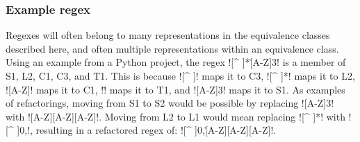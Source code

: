 \subsubsection{Example regex}
Regexes will often belong to many representations in the equivalence classes described here, and often multiple representations within an equivalence class.
Using an example from a Python project, the regex \cverb![^ ]*\.[A-Z]{3}! is a member of S1, L2, C1, C3, and T1. This is because \cverb![^ ]! maps it to C3, \cverb![^ ]*! maps it to L2, \cverb![A-Z]! maps it to C1, \cverb!\.! maps it to T1, and \cverb![A-Z]{3}! maps it to S1.
As examples of refactorings, moving from S1 to S2 would be possible by replacing \cverb![A-Z]{3}! with \cverb![A-Z][A-Z][A-Z]!.  Moving from L2 to L1 would mean replacing \cverb![^ ]*! with \cverb![^ ]{0,}!, resulting in a refactored regex of: \cverb![^ ]{0,}\.[A-Z][A-Z][A-Z]!.
